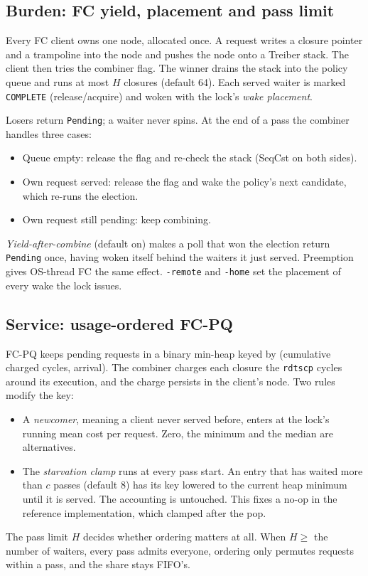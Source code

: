 \documentclass[10pt,twocolumn]{article}
\newcommand{\lk}[1]{\texttt{#1}}
\begin{document}
\subsection{Burden: FC yield, placement and pass limit}
Every FC client owns one node, allocated once. A request writes a closure
pointer and a trampoline into the node and pushes the node onto a Treiber
stack. The client then tries the combiner flag. The winner drains the stack
into the policy queue and runs at most $H$ closures (default 64). Each served
waiter is marked \lk{COMPLETE} (release/acquire) and woken with the lock's
\emph{wake placement}.

Losers return \lk{Pending}; a waiter never spins. At the end of a pass the
combiner handles three cases:
\begin{itemize}
\item Queue empty: release the flag and re-check the stack (SeqCst on both
  sides).
\item Own request served: release the flag and wake the policy's next
  candidate, which re-runs the election.
\item Own request still pending: keep combining.
\end{itemize}
\emph{Yield-after-combine} (default on) makes a poll that won the election
return \lk{Pending} once, having woken itself behind the waiters it just
served. Preemption gives OS-thread FC the same effect. \lk{-remote} and
\lk{-home} set the placement of every wake the lock issues.

\subsection{Service: usage-ordered FC-PQ}
FC-PQ keeps pending requests in a binary min-heap keyed by
(cumulative charged cycles, arrival). The combiner charges each closure the
\lk{rdtscp} cycles around its execution, and the charge persists in the
client's node. Two rules modify the key:
\begin{itemize}
\item A \emph{newcomer}, meaning a client never served before, enters at the
  lock's running mean cost per request. Zero, the minimum and the median are
  alternatives.
\item The \emph{starvation clamp} runs at every pass start. An entry that has
  waited more than $c$ passes (default 8) has its key lowered to the current
  heap minimum until it is served. The accounting is untouched. This fixes a
  no-op in the reference implementation, which clamped after the pop.
\end{itemize}
The pass limit $H$ decides whether ordering matters at all. When
$H\ge$ the number of waiters, every pass admits everyone, ordering only
permutes requests within a pass, and the share stays FIFO's.
\end{document}
